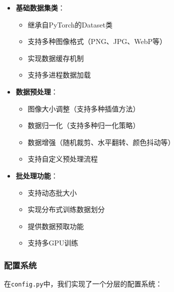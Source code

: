\documentclass{ctexart}
\begin{document}
\begin{itemize}
    \item \textbf{基础数据集类}：
    \begin{itemize}
        \item 继承自PyTorch的Dataset类
        \item 支持多种图像格式（PNG、JPG、WebP等）
        \item 实现数据缓存机制
        \item 支持多进程数据加载
    \end{itemize}
    
    \item \textbf{数据预处理}：
    \begin{itemize}
        \item 图像大小调整（支持多种插值方法）
        \item 数据归一化（支持多种归一化策略）
        \item 数据增强（随机裁剪、水平翻转、颜色抖动等）
        \item 支持自定义预处理流程
    \end{itemize}
    
    \item \textbf{批处理功能}：
    \begin{itemize}
        \item 支持动态批大小
        \item 实现分布式训练数据划分
        \item 提供数据预取功能
        \item 支持多GPU训练
    \end{itemize}
\end{itemize}

\subsubsection{配置系统}
\noindent
在\texttt{config.py}中，我们实现了一个分层的配置系统：
\end{document}
